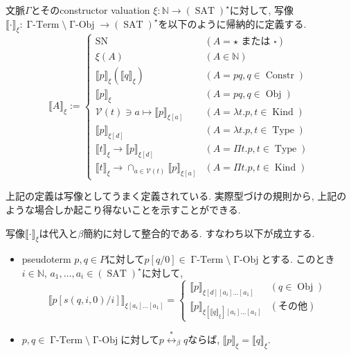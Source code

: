 \documentclass[12pt, titlepage]{ltjsarticle}
\DeclareMathOperator{\SN}{SN}
\DeclareMathOperator{\Obj}{Obj}
\DeclareMathOperator{\Constr}{Constr}
\DeclareMathOperator{\Type}{Type}
\DeclareMathOperator{\Kind}{Kind}
\DeclareMathOperator{\SAT}{SAT}
\DeclareMathOperator{\GTerm}{\Gamma-Term}
\DeclareMathOperator{\GObj}{\Gamma-Obj}
\newcommand{\iprt}[2]{\llbracket {#1} \rrbracket_ {#2}}
\begin{document}
\begin{defn}
 文脈$\Gamma$とそのconstructor valuation $\xi : \mathbb{N} \rightarrow (\SAT)^\star$に対して, 写像$\iprt{\cdot}{\xi} : \GTerm \setminus \GObj \rightarrow (\SAT)^\star$を以下のように帰納的に定義する.
\[
 \iprt{A}{\xi} := \begin{cases}
    \SN & (A = \star \text{ または } \square) \\
    \xi (A) & (A \in \mathbb{N}) \\
    \iprt{p}{\xi} (\iprt{q}{\xi}) & (A = p q, q \in \Constr) \\
    \iprt{p}{\xi} & (A = p q, q \in \Obj) \\
    \mathcal{V} (t) \ni a \mapsto \iprt{p}{\xi[a]} & (A = \lambda t. p, t \in \Kind) \\
    \iprt{p}{\xi[d]} & (A = \lambda t. p, t \in \Type) \\
    \iprt{t}{\xi} \rightarrow \iprt{p}{\xi[d]} & (A = \Pi t. p, t \in \Type) \\
    \iprt{t}{\xi} \rightarrow \cap_{a \in \mathcal{V}(t)} \iprt{p}{\xi[a]} & (A = \Pi t. p, t \in \Kind)
  \end{cases}
\]
\end{defn}
\begin{rem}
 上記の定義は写像としてうまく定義されている. 実際型づけの規則から, 上記のような場合しか起こり得ないことを示すことができる.
\end{rem}
\begin{lem}\label{betap}
 写像$\iprt{\cdot}{\xi}$は代入と$\beta$簡約に対して整合的である. すなわち以下が成立する.
 \begin{itemize}
  \item pseudoterm $p, q \in P$に対して$p [q/0] \in \GTerm \setminus \GObj$とする.
        このとき$i \in \mathbb{N}$, $a_1, \ldots, a_i \in (\SAT)^\star$に対して,
        \[
        \iprt{p [s (q, i, 0)/i]}{\xi[a_i]\ldots[a_1]} = \begin{cases}
        \iprt{p}{\xi[d][a_i]\ldots[a_1]} & (q \in \Obj) \\
        \iprt{p}{\xi[\iprt{q}{\xi}][a_i]\ldots[a_1]} & (\text{その他})
        \end{cases}
        \]
  \item $p, q \in \GTerm \setminus \GObj$に対して$p \overset{*}{\leftrightarrow}_\beta q$ならば, $\iprt{p}{\xi} = \iprt{q}{\xi}$.
 \end{itemize}
\end{lem}
\end{document}
